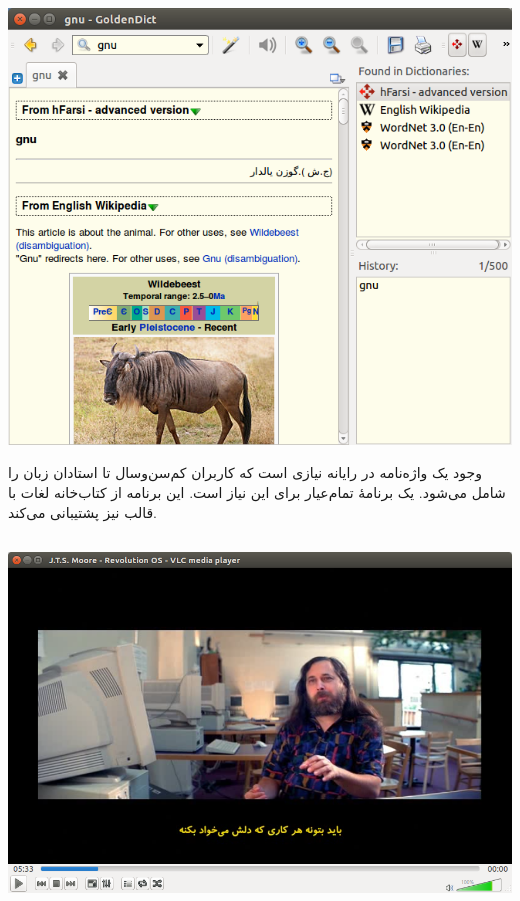\begin{center}
\includegraphics[scale=0.39]{pics/48.png}
\end{center}

وجود یک واژه‌نامه در رایانه نیازی است که کاربران کم‌سن‌وسال تا استادان زبان را شامل می‌شود.  یک برنامهٔ تمام‌عیار برای این نیاز است. این برنامه از کتاب‌خانه لغات  با قالب  نیز پشتیبانی می‌کند.

\subsection[VLC]{}

\begin{center}
\includegraphics[scale=0.39]{pics/49.png}
\end{center}

